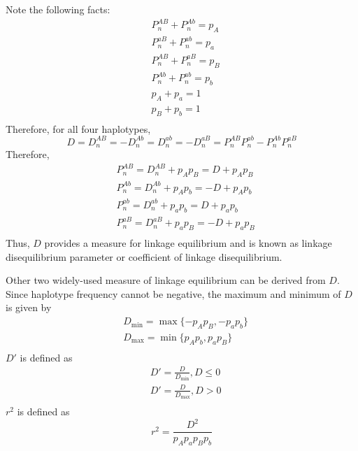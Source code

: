 \documentclass[11pt]{article}
\begin{document}
\begin{sloppypar}
\par

Note the following facts:
\begin{equation}
\begin{align}
  & P^{AB}_n + P^{Ab}_n = p_A \\
  & P^{aB}_n + P^{ab}_n = p_a \\
  & P^{AB}_n + P^{aB}_n = p_B \\
  & P^{Ab}_n + P^{ab}_n = p_b \\
  & p_A + p_a = 1 \\
  & p_B + p_b = 1 \\
\end{align}
\end{equation}
Therefore, for all four haplotypes, 
\begin{equation}
  D = D^{AB}_n = -D^{Ab}_n = D^{ab}_n = -D^{aB}_n = P^{AB}_nP^{ab}_n - P^{Ab}_nP^{aB}_n
\end{equation}
Therefore, 
\begin{equation}
\begin{align}
  & P^{AB}_n = D^{AB}_n + p_Ap_B = D + p_Ap_B \\
  & P^{Ab}_n = D^{Ab}_n + p_Ap_b = -D + p_Ap_b \\
  & P^{ab}_n = D^{ab}_n + p_ap_b = D + p_ap_b \\
  & P^{aB}_n = D^{aB}_n + p_ap_B = -D + p_ap_B \\
\end{align}
\end{equation}
Thus, $D$ provides a measure for linkage equilibrium and is known as linkage disequilibrium parameter or coefficient of linkage disequilibrium. 

\par

Other two widely-used measure of linkage equilibrium can be derived from $D$. 
Since haplotype frequency cannot be negative, the maximum and minimum of $D$ is given by 
\begin{equation}
\begin{align}
  & D_{\min} = \max\{-p_Ap_B,-p_ap_b\} \\
  & D_{\max} = \min\{p_Ap_b,p_ap_B\} \\
\end{align}
\end{equation}
$D'$ is defined as 
\begin{equation}
\begin{align}
  & D' = \frac{D}{D_{\min}}, D \le 0 \\
  & D' = \frac{D}{D_{\max}}, D > 0 \\
\end{align}
\end{equation}
$r^2$ is defined as 
\begin{equation}
  r^2 = \frac{D^2}{p_Ap_ap_Bp_b}
\end{equation}

\end{sloppypar}
\end{document}
